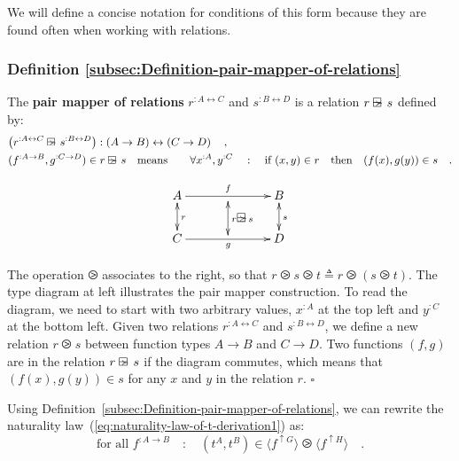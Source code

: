 We will define a concise notation for conditions of this form because
they are found often when working with relations.

\subsubsection{Definition \label{subsec:Definition-pair-mapper-of-relations}\ref{subsec:Definition-pair-mapper-of-relations}}

The \textbf{pair mapper of relations}
$r^{:A\leftrightarrow C}$ and $s^{:B\leftrightarrow D}$ is a relation
$r\varogreaterthan s$ defined by:
\begin{align*}
 & \big(r^{:A\leftrightarrow C}\varogreaterthan s^{:B\leftrightarrow D}\big):\left(A\rightarrow B\right)\leftrightarrow\left(C\rightarrow D\right)\quad,\\
 & (f^{:A\rightarrow B},g^{:C\rightarrow D})\in r\varogreaterthan s\quad\text{means}\quad\quad\forall x^{:A},y^{:C}\quad:\quad\text{if }(x,y)\in r\quad\text{then}\quad(f(x),g(y))\in s\quad.
\end{align*}

\begin{wrapfigure}{l}{0.24\columnwidth}%
\vspace{-2.8\baselineskip}
\[
\xymatrix{\xyScaleY{1.8pc}\xyScaleX{2.6pc}A\ar@{<->}[d]\sp(0.5){r}\ar[rr]\sp(0.5){f} & \ar@{<->}[d(0.9)]\sp(0.55){r\varogreaterthan s} & B\ar@{<->}[d]\sp(0.5){s}\\
C\ar[rr]\sb(0.5){g} &  & D
}
\]

\vspace{-2.5\baselineskip}
\end{wrapfigure}%

\noindent The operation $\ogreaterthan$ associates to the right,
so that $r\ogreaterthan s\ogreaterthan t\triangleq r\ogreaterthan\left(s\ogreaterthan t\right)$.
The type diagram at left illustrates the pair mapper construction.
To read the diagram, we need to start with two arbitrary values, $x^{:A}$
at the top left and $y^{:C}$ at the bottom left. Given two relations
$r^{:A\leftrightarrow C}$ and $s^{:B\leftrightarrow D}$, we define
a new relation $r\ogreaterthan s$ between function types $A\rightarrow B$
and $C\rightarrow D$. Two functions $\left(f,g\right)$ are in the
relation $r\varogreaterthan s$ if the diagram commutes, which means
that $(f(x),g(y))\in s$ for any $x$ and $y$ in the relation $r$.
$\square$

Using Definition~\ref{subsec:Definition-pair-mapper-of-relations},
we can rewrite the naturality law~(\ref{eq:naturality-law-of-t-derivation1})
as:
\[
\text{for all }f^{:A\rightarrow B}\quad:\quad(t^{A},t^{B})\in\langle f^{\uparrow G}\rangle\ogreaterthan\langle f^{\uparrow H}\rangle\quad.
\]

